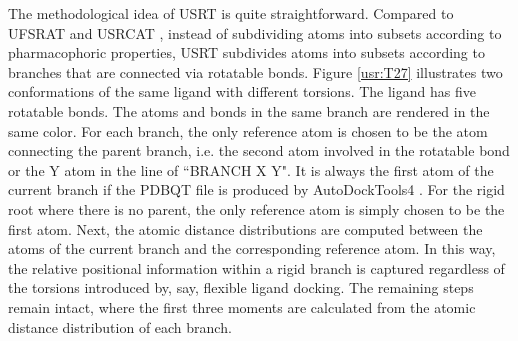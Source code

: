 The methodological idea of USRT is quite straightforward. Compared to UFSRAT \citep{1436} and USRCAT \citep{1331}, instead of subdividing atoms into subsets according to pharmacophoric properties, USRT subdivides atoms into subsets according to branches that are connected via rotatable bonds. Figure \ref{usr:T27} illustrates two conformations of the same ligand with different torsions. The ligand has five rotatable bonds. The atoms and bonds in the same branch are rendered in the same color. For each branch, the only reference atom is chosen to be the atom connecting the parent branch, i.e. the second atom involved in the rotatable bond or the Y atom in the line of ``BRANCH X Y". It is always the first atom of the current branch if the PDBQT file is produced by AutoDockTools4 \citep{596}. For the rigid root where there is no parent, the only reference atom is simply chosen to be the first atom. Next, the atomic distance distributions are computed between the atoms of the current branch and the corresponding reference atom. In this way, the relative positional information within a rigid branch is captured regardless of the torsions introduced by, say, flexible ligand docking. The remaining steps remain intact, where the first three moments are calculated from the atomic distance distribution of each branch.

